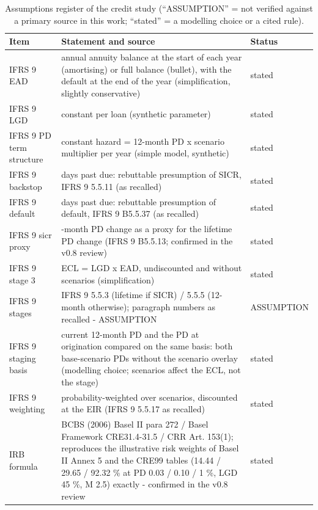 \begin{table}[H]
\centering
\scriptsize
\caption{Assumptions register of the credit study (``ASSUMPTION'' = not verified against a primary source in this work; ``stated'' = a modelling choice or a cited rule).}
\label{tab:C5_assumptions}
\setlength{\tabcolsep}{3pt}
\begin{tabular}{>{\raggedright\arraybackslash}p{3.0cm}>{\raggedright\arraybackslash}p{10.6cm}>{\raggedright\arraybackslash}p{2.1cm}}
\toprule
Item & Statement and source & Status \\
\midrule
IFRS 9 EAD & annual annuity balance at the start of each year (amortising) or full balance (bullet), with the default at the end of the year (simplification, slightly conservative) & stated \\
IFRS 9 LGD & constant per loan (synthetic parameter) & stated \\
IFRS 9 PD term structure & constant hazard = 12-month PD x scenario multiplier per year (simple model, synthetic) & stated \\
IFRS 9 backstop & 30 days past due: rebuttable presumption of SICR, IFRS 9 5.5.11 (as recalled) & stated \\
IFRS 9 default & 90 days past due: rebuttable presumption of default, IFRS 9 B5.5.37 (as recalled) & stated \\
IFRS 9 sicr proxy & 12-month PD change as a proxy for the lifetime PD change (IFRS 9 B5.5.13; confirmed in the v0.8 review) & stated \\
IFRS 9 stage 3 & ECL = LGD x EAD, undiscounted and without scenarios (simplification) & stated \\
IFRS 9 stages & IFRS 9 5.5.3 (lifetime if SICR) / 5.5.5 (12-month otherwise); paragraph numbers as recalled - ASSUMPTION & ASSUMPTION \\
IFRS 9 staging basis & current 12-month PD and the PD at origination compared on the same basis: both base-scenario PDs without the scenario overlay (modelling choice; scenarios affect the ECL, not the stage) & stated \\
IFRS 9 weighting & probability-weighted over scenarios, discounted at the EIR (IFRS 9 5.5.17 as recalled) & stated \\
IRB formula & BCBS (2006) Basel II para 272 / Basel Framework CRE31.4-31.5 / CRR Art. 153(1); reproduces the illustrative risk weights of Basel II Annex 5 and the CRE99 tables (14.44 / 29.65 / 92.32 \% at PD 0.03 / 0.10 / 1 \%, LGD 45 \%, M 2.5) exactly - confirmed in the v0.8 review & stated \\

\end{tabular}
\end{table}
